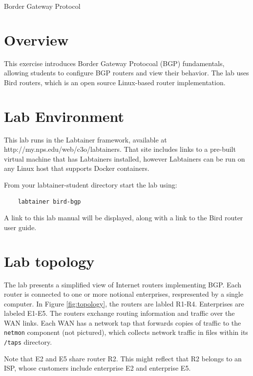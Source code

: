 


\begin{center}
{\LARGE Border Gateway Protocol}
\vspace{0.1in}\\
\end{center}


\section{Overview}
This exercise introduces Border Gateway Protocoal (BGP) fundamentals,
allowing students to configure BGP routers and view their behavior.
The lab uses Bird routers, which is an open source Linux-based router
implementation.


\section{Lab Environment}
This lab runs in the Labtainer framework,
available at http://my.nps.edu/web/c3o/labtainers.
That site includes links to a pre-built virtual machine
that has Labtainers installed, however Labtainers can
be run on any Linux host that supports Docker containers.

From your labtainer-student directory start the lab using:
\begin{verbatim}
    labtainer bird-bgp
\end{verbatim}
A link to this lab manual will be displayed, along with a link to the Bird router 
user guide.

\section{Lab topology}
The lab presents a simplified view of Internet routers implementing BGP.  Each router is connected to one or more notional
enterprises, respresented by a single computer.  In Figure \ref{fig:topology}, the routers are labled R1-R4.  Enterprises
are labeled E1-E5.  The routers exchange routing information and traffic over the WAN links.
Each WAN has a network tap that forwards copies of traffic to the {\tt netmon} component (not pictured), 
which collects network traffic in files within its {\tt /taps} directory.

Note that E2 and E5 share router R2.  This might reflect that R2 belongs to an ISP, whose customers include
enterprise E2 and enterprise E5.  

